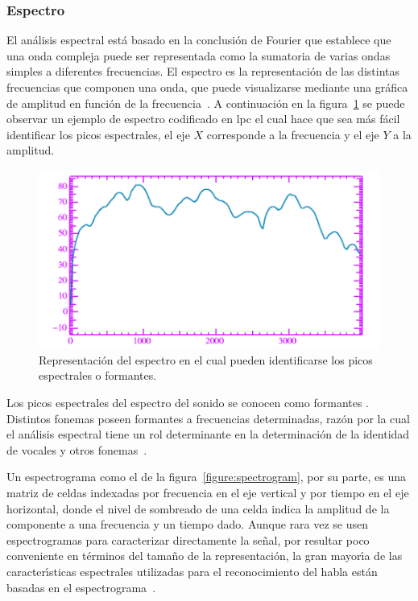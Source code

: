 \subsubsection{Espectro}
El an\'alisis espectral est\'a basado en la conclusi\'on de Fourier que establece que una onda compleja puede ser 
representada como la sumatoria de varias ondas simples a diferentes frecuencias. El espectro es la representaci\'on de las 
distintas frecuencias que componen una onda, que puede visualizarse mediante una gr\'afica de amplitud en funci\'on de la 
\mbox{frecuencia \cite{Jurafsky}}. A continuaci\'on en la figura~\ref{figure:formants} se puede observar un ejemplo
de espectro codificado en \gls{lpc} \cite{KesarkarFeature2003} el cual hace que sea m\'as f\'acil identificar los picos espectrales,
el eje $X$ corresponde a la frecuencia y el eje $Y$ a la amplitud.

\begin{figure}[H]
\centering
\includegraphics[width=0.6\linewidth]{./graphics/formants.png}
\caption{Representaci\'on del espectro en el cual pueden identificarse los picos espectrales o formantes.}
\label{figure:formants}
\end{figure}

Los picos espectrales del espectro del sonido se conocen como formantes \cite{Fant1960acoustic}. Distintos fonemas poseen 
formantes a frecuencias determinadas, raz\'on por la cual el an\'alisis espectral tiene un rol determinante en la 
determinaci\'on de la identidad de vocales y otros \mbox{fonemas \cite{LadefogedCourse2006}}.

Un espectrograma como el de la figura~\ref{figure:spectrogram}, por su parte, es una matriz de celdas indexadas por frecuencia en el eje vertical y por tiempo en el eje 
horizontal, donde el nivel de sombreado de una celda indica la amplitud de la componente a una frecuencia y un tiempo 
dado. Aunque rara vez se usen espectrogramas para caracterizar directamente la se\~nal, por resultar poco conveniente en t\'erminos del 
tama\~no de la representaci\'on, la gran mayor{\'\i}a de las caracter{\'\i}sticas espectrales utilizadas para el reconocimiento del 
habla est\'an basadas en el \mbox{espectrograma \cite{Ellis08anintroduction}}.

